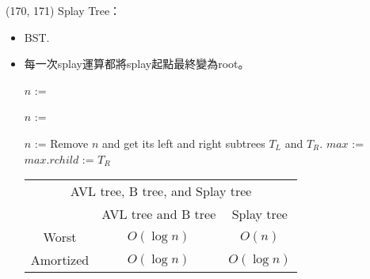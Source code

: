 \item \begin{theorem}{(170, 171)} Splay Tree： \label{splaytree}\begin{itemize}
        \item BST.
        \item 每一次splay運算都將splay起點最終變為root。
        \begin{algorithm}[H]
            \begin{algorithmic}[1]
                    \State $n$ := 
                    \State {}
                \EndFunction
            \end{algorithmic}
        \end{algorithm}
        \begin{algorithm}[H]
            \begin{algorithmic}[1]
                    \State $n$ := 
                    \State {}
                \EndFunction
            \end{algorithmic}
        \end{algorithm}
        \begin{algorithm}[H]
            \begin{algorithmic}[1]
                    \State $n$ := 
                    \State {}
                    \State Remove $n$ and get its left and right subtrees $T_L$ and $T_R$.
                    \State $max$ := 
                    \State {}
                    \State $max.rchild$ := $T_R$
                \EndFunction
            \end{algorithmic}
        \end{algorithm}
        \begin{table}[H]
            \centering
            \begin{tabular}{|c|c|c|}
                \hline
                \multicolumn{3}{|c|}{AVL tree, B tree, and Splay tree} \\
                \Xhline{3\arrayrulewidth}
                & AVL tree and B tree & Splay tree \\
                \Xhline{2\arrayrulewidth}
                Worst & $O(\log n)$ & $O(n)$ \\
                \hline
                Amortized & $O(\log n)$ & $O(\log n)$ \\
                \hline
            \end{tabular}
        \end{table}
    \end{itemize}
\end{theorem}

